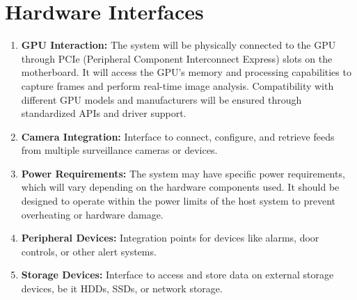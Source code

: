 \documentclass{scrreprt}
\begin{document}
    \section{Hardware Interfaces}                
            \begin{enumerate}
                \item \textbf{GPU Interaction:} The system will be physically connected to the GPU through PCIe (Peripheral Component Interconnect Express) slots on the motherboard. It will access the GPU's memory and processing capabilities to capture frames and perform real-time image analysis. Compatibility with different GPU models and manufacturers will be ensured through standardized APIs and driver support.
                \item \textbf{Camera Integration:} Interface to connect, configure, and retrieve feeds from multiple surveillance cameras or devices.
                \item \textbf{Power Requirements:} The system may have specific power requirements, which will vary depending on the hardware components used. It should be designed to operate within the power limits of the host system to prevent overheating or hardware damage.
                \item \textbf{Peripheral Devices:} Integration points for devices like alarms, door controls, or other alert systems.
                \item \textbf{Storage Devices:} Interface to access and store data on external storage devices, be it HDDs, SSDs, or network storage.
            \end{enumerate}
    
\end{document}
